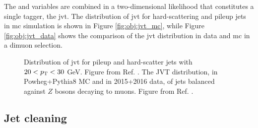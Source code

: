 The \cJVF and \RpT variables are combined in a two-dimensional likelihood that constitutes a single tagger, the \gls{jvt}. 
The distribution of \gls{jvt} for hard-scattering and pileup jets in \gls{mc} simulation is shown in Figure \ref{fig:obj:jvt_mc},
while Figure \ref{fig:obj:jvt_data} shows the comparison of the \gls{jvt} distribution in data and \gls{mc} in a dimuon selection.


\begin{figure}[h]
\begin{center}
\end{center}
 \caption{ Distribution of \gls{jvt} for pileup and hard-scatter jets with $20 < p_{\rm T} < 30$ GeV. Figure from Ref. \cite{ATLAS-CONF-2014-018}.  The JVT distribution, in Powheg+Pythia8 MC and in 2015+2016 data, of jets balanced against $Z$ bosons decaying to muons. Figure from Ref. \cite{jvtpublicplots}.}
  \label{fig:obj:jvt}
\end{figure}

\subsection{Jet cleaning}
\label{sec:jetcleaning}

